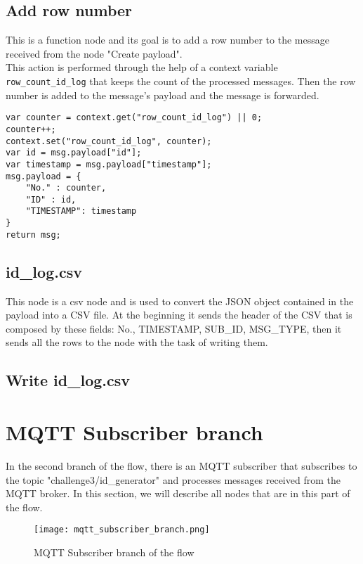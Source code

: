 \subsection{Add row number}
This is a function node and its goal is to add a row number to the message received from the node "Create payload".\\
This action is performed through the help of a context variable \verb|row_count_id_log| that keeps the count of the processed messages.
Then the row number is added to the message's payload and the message is forwarded.

\begin{verbatim}
var counter = context.get("row_count_id_log") || 0;
counter++;
context.set("row_count_id_log", counter);
var id = msg.payload["id"];
var timestamp = msg.payload["timestamp"];
msg.payload = {
    "No." : counter,
    "ID" : id,
    "TIMESTAMP": timestamp
}
return msg;
\end{verbatim}

\subsection{id\_log.csv}
This node is a csv node and is used to convert the JSON object contained in the payload into a CSV file.
At the beginning it sends the header of the CSV that is composed by these fields: No., TIMESTAMP, SUB\_ID, MSG\_TYPE, then it sends all the rows to the node with the task of writing them.

\subsection{Write id\_log.csv}


\section{MQTT Subscriber branch}
\label{sec:subscriber_branch}

In the second branch of the flow, there is an MQTT subscriber that subscribes to the topic "challenge3/id\_generator" and processes messages received from the MQTT broker. In this section, we will describe all nodes that are in this part of the flow.

\begin{figure}[H]
    \centering
    \texttt{[image: mqtt\_subscriber\_branch.png]}
    \caption{MQTT Subscriber branch of the flow}
\end{figure}

